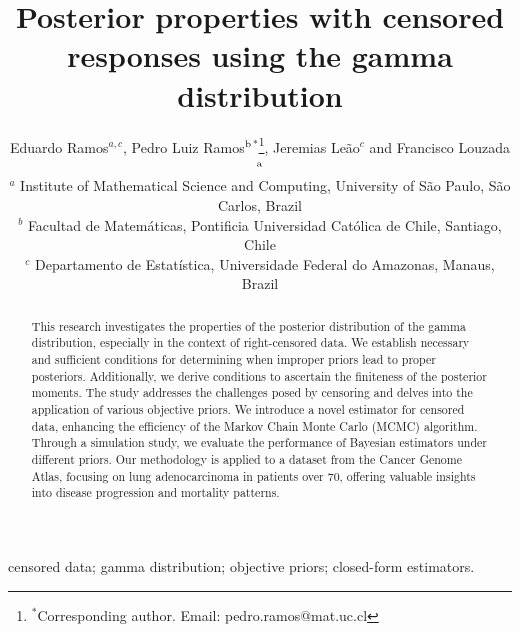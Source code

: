 \documentclass[]{interact}
\theoremstyle{plain}%
\theoremstyle{definition}
\theoremstyle{remark}
\begin{document}

\title{Posterior properties with censored responses using the gamma distribution}

\author{Eduardo Ramos$^{a,c}$, Pedro Luiz Ramos$^{\rm b}$$^{\ast}$\thanks{$^\ast$Corresponding author. Email: pedro.ramos@mat.uc.cl
\vspace{6pt}}, 
Jeremias Le\~ao$^{c}$
and 
Francisco Louzada$^{\rm a}$ \\\vspace{6pt} 
$^{a}$ {Institute of Mathematical Science and Computing, University of S\~ao Paulo, S\~ao Carlos, Brazil} \\%
$^{b}$ {Facultad de Matem\'aticas, Pontificia Universidad Cat\'olica
de Chile, Santiago, Chile}\\
$^{c}$ {Departamento de Estat\'istica, Universidade Federal do Amazonas, Manaus, Brazil} 
}


\maketitle

\begin{abstract}

This research investigates the properties of the posterior distribution of the gamma distribution, especially in the context of right-censored data. We establish necessary and sufficient conditions for determining when improper priors lead to proper posteriors. Additionally, we derive conditions to ascertain the finiteness of the posterior moments. The study addresses the challenges posed by censoring and delves into the application of various objective priors. We introduce a novel estimator for censored data, enhancing the efficiency of the Markov Chain Monte Carlo (MCMC) algorithm. Through a simulation study, we evaluate the performance of Bayesian estimators under different priors. Our methodology is applied to a dataset from the Cancer Genome Atlas, focusing on lung adenocarcinoma in patients over 70, offering valuable insights into disease progression and mortality patterns.



\end{abstract}

\begin{keywords}
censored data; gamma distribution; objective priors; closed-form estimators.
\end{keywords}
\end{document}
